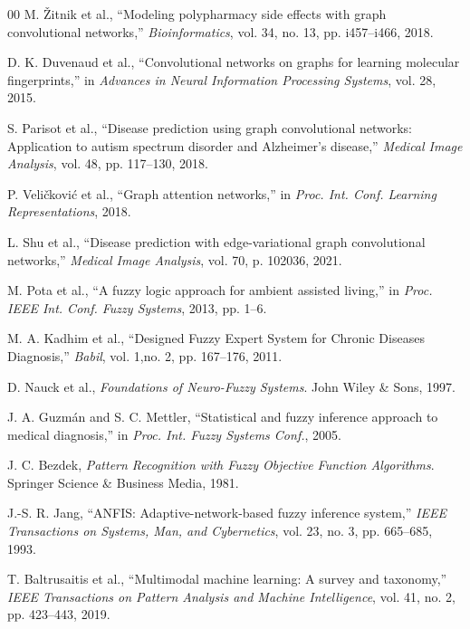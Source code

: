 \documentclass[conference]{IEEEtran}
\begin{document}
{{{\begin{thebibliography}{00}
M. Žitnik et al., ``Modeling polypharmacy side effects with graph convolutional networks,'' \textit{Bioinformatics}, vol. 34, no. 13, pp. i457--i466, 2018.

D. K. Duvenaud et al., ``Convolutional networks on graphs for learning molecular fingerprints,'' in \textit{Advances in Neural Information Processing Systems}, vol. 28, 2015.

S. Parisot et al., ``Disease prediction using graph convolutional networks: Application to autism spectrum disorder and Alzheimer's disease,'' \textit{Medical Image Analysis}, vol. 48, pp. 117--130, 2018.

P. Veličković et al., ``Graph attention networks,'' in \textit{Proc. Int. Conf. Learning Representations}, 2018.

L. Shu et al., ``Disease prediction with edge-variational graph convolutional networks,'' \textit{Medical Image Analysis}, vol. 70, p. 102036, 2021.

M. Pota et al., ``A fuzzy logic approach for ambient assisted living,'' in \textit{Proc. IEEE Int. Conf. Fuzzy Systems}, 2013, pp. 1--6.

M. A. Kadhim et al., ``Designed Fuzzy Expert System for Chronic Diseases Diagnosis,'' \textit{Babil}, vol. 1,no. 2, pp. 167--176, 2011.

D. Nauck et al., \textit{Foundations of Neuro-Fuzzy Systems}. John Wiley \& Sons, 1997.

J. A. Guzmán and S. C. Mettler, ``Statistical and fuzzy inference approach to medical diagnosis,'' in \textit{Proc. Int. Fuzzy Systems Conf.}, 2005.

J. C. Bezdek, \textit{Pattern Recognition with Fuzzy Objective Function Algorithms}. Springer Science \& Business Media, 1981.

J.-S. R. Jang, ``ANFIS: Adaptive-network-based fuzzy inference system,'' \textit{IEEE Transactions on Systems, Man, and Cybernetics}, vol. 23, no. 3, pp. 665--685, 1993.

T. Baltrusaitis et al., ``Multimodal machine learning: A survey and taxonomy,'' \textit{IEEE Transactions on Pattern Analysis and Machine Intelligence}, vol. 41, no. 2, pp. 423--443, 2019.


\end{thebibliography}}}}
\end{document}
